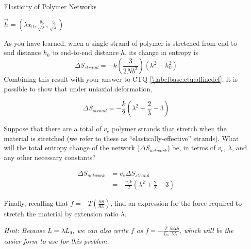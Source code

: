 \begin{activity}{Elasticity of Polymer Networks}
\begin{ctqs}
			\begin{solution}[0.75in]
				$\vec h = (\lambda x_0, \frac{y_0}{\sqrt{\lambda}}, \frac{z_0}{\sqrt{\lambda}})$
			\end{solution}
				
\end{ctqs}

\begin{infobox}

	As you have learned, when a single strand of polymer is stretched from end-to-end distance $h_0$ to end-to-end distance $h$, its change in entropy is 
			\begin{equation*}
				\Delta S_{strand} = -k\left(\frac{3}{2Nb^2}\right)(h^2 - h_0^2)
			\end{equation*}
	Combining this result with your answer to CTQ \ref{\labelbase:ctq:affinedef}, it is possible to show that under uniaxial deformation,
	
		\begin{equation*}	
				\Delta S_{strand} = -\frac{k}{2}\left(\lambda^2 + \frac{2}{\lambda} - 3\right)
			\label{\labelbase:eqn:delSstranduniaxial}
		\end{equation*}
			
\end{infobox}

\begin{ctqs}
		
	\question Suppose that there are a total of $v_e$ polymer strands that stretch when the material is stretched (we refer to these as ``elastically-effective'' strands). What will the total entropy change of the network ($\Delta S_{network}$) be, in terms of $v_e$, $\lambda$, and any other necessary constants?
		
			\begin{solution}[1.25in]
				\begin{align*}
					\Delta S_{network} &= v_e \Delta S_{strand}\\
						&= -\frac{v_e k}{2}\left(\lambda^2 + \frac{2}{\lambda} - 3\right)
				\end{align*}
			\end{solution}
		
	\question Finally, recalling that $f = -T\left(\frac{\partial S}{\partial L}\right)$, find an expression for the force required to stretch the material by extension ratio $\lambda$.
	
		\emph{Hint: Because $L = \lambda L_0$, we can also write $f$ as $f = -\frac{T}{L_0}\frac{\partial \Delta S}{\partial \lambda}$, which will be the easier form to use for this problem.}
		

\end{ctqs}
\end{activity}
